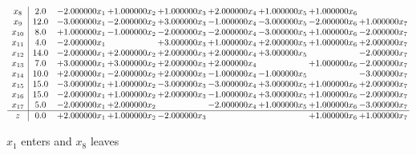 \documentclass[10pt]{article}
\begin{document}
\[\begin{array}{c| c c@{\hskip 2pt} c@{\hskip 2pt} c@{\hskip 2pt} c@{\hskip 2pt} c@{\hskip 2pt} c@{\hskip 2pt} c@{\hskip 2pt} }
 x_{8}   &  2.0 & -2.000000 x_{1} & + 1.000000 x_{2} & + 1.000000 x_{3} & + 2.000000 x_{4} & + 1.000000 x_{5} & + 1.000000 x_{6} &   \\
 x_{9}   &  12.0 & -3.000000 x_{1} & -2.000000 x_{2} & + 3.000000 x_{3} & -1.000000 x_{4} & -3.000000 x_{5} & -2.000000 x_{6} & + 1.000000 x_{7}\\
 x_{10}   &  8.0 & + 1.000000 x_{1} & -1.000000 x_{2} & -2.000000 x_{3} & -2.000000 x_{4} & -3.000000 x_{5} & + 1.000000 x_{6} & -2.000000 x_{7}\\
 x_{11}   &  4.0 & -2.000000 x_{1} &   & + 3.000000 x_{3} & + 1.000000 x_{4} & + 2.000000 x_{5} & + 1.000000 x_{6} & + 2.000000 x_{7}\\
 x_{12}   &  14.0 & -2.000000 x_{1} & + 2.000000 x_{2} & + 2.000000 x_{3} & + 2.000000 x_{4} & + 3.000000 x_{5} &   & -2.000000 x_{7}\\
 x_{13}   &  7.0 & + 3.000000 x_{1} & + 3.000000 x_{2} & + 2.000000 x_{3} & + 2.000000 x_{4} &   & + 1.000000 x_{6} & -2.000000 x_{7}\\
 x_{14}   &  10.0 & + 2.000000 x_{1} & -2.000000 x_{2} & + 2.000000 x_{3} & -1.000000 x_{4} & -1.000000 x_{5} &   & -3.000000 x_{7}\\
 x_{15}   &  15.0 & -3.000000 x_{1} & + 1.000000 x_{2} & -3.000000 x_{3} & -3.000000 x_{4} & + 3.000000 x_{5} & + 1.000000 x_{6} & + 2.000000 x_{7}\\
 x_{16}   &  15.0 & -2.000000 x_{1} & + 1.000000 x_{2} & + 2.000000 x_{3} & -1.000000 x_{4} & + 3.000000 x_{5} & + 1.000000 x_{6} & -2.000000 x_{7}\\
 x_{17}   &  5.0 & -2.000000 x_{1} & + 2.000000 x_{2} &   & -2.000000 x_{4} & + 1.000000 x_{5} & + 1.000000 x_{6} & -3.000000 x_{7}\\
\hline
z    &  0.0 & + 2.000000 x_{1} & + 1.000000 x_{2} & -2.000000 x_{3} &    &   & + 1.000000 x_{6} & + 1.000000 x_{7}\\
\end{array}\]


 $ x_{1} $ enters and $ x_{8} $ leaves 
\end{document}
